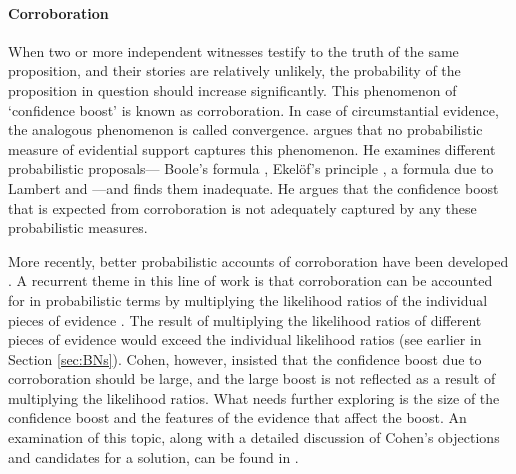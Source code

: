 \documentclass{article}
\begin{document}
\paragraph{Corroboration} When two or more independent witnesses testify to the truth of the same proposition, and their stories are relatively unlikely, the probability of the proposition in question should increase significantly. This phenomenon of `confidence boost' is known as corroboration.  In case of circumstantial evidence, the analogous phenomenon is called convergence. \cite{Cohen1977The-probable-an} argues  that  no probabilistic measure of evidential support captures this  phenomenon. He examines different probabilistic proposals---
Boole's formula \citep{Boole1857}, Ekel\"of's principle \citep{ekelof1964free}, a formula due to Lambert and \citet{kruskal1988MiraclesStatisticsCasual}---and finds them inadequate.  
He argues that the  confidence boost that is expected from corroboration is not adequately captured by any these probabilistic measures. 

More recently, better probabilistic 
accounts of corroboration have been developed \citep{taroni2006bayesian,robertson2016interpreting,Fenton2018Risk}. A recurrent theme in this line of work is  that corroboration can be accounted for in probabilistic terms by multiplying the likelihood ratios of the individual pieces of evidence \citep[see general discussion in][chp.\ 5 of]{bovens2004bayesian}.
%
%
The result of multiplying the likelihood ratios of different pieces of evidence 
would exceed the individual likelihood ratios (see earlier in Section \ref{sec:BNs}). Cohen, however, insisted that the  confidence boost due to corroboration should be large, and the large boost is not reflected 
as  a result of multiplying the likelihood ratios.
What needs further exploring is  the size of the confidence boost and the features of the evidence that affect the boost.
An examination of this topic, along with a detailed discussion of Cohen's objections and candidates for a solution, can be found in \citep{urbaniak2019ProbabilisticModelsLegal}. %
\end{document}
